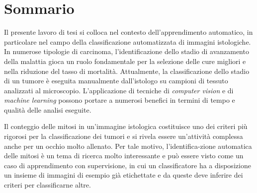\newpage
\chapter*{Sommario}



\vspace{1.3cm}


Il presente lavoro di tesi si colloca nel contesto dell'apprendimento automatico, in particolare 
nel campo della classificazione automatizzata di immagini istologiche.\\
In numerose tipologie di carcinoma, l'identificazione dello stadio di avanzamento della malattia gioca un ruolo fondamentale
per la selezione delle cure migliori e nella riduzione del tasso di mortalit\`{a}. Attualmente, la classificazione
dello stadio di un tumore \`{e} eseguita manualmente dall'istologo su campioni di tessuto analizzati al microscopio.
L'applicazione di tecniche di \textit{computer vision} e di \textit{machine learning} possono portare a numerosi benefici in termini di
tempo e qualit\`{a} delle analisi eseguite.

\vspace{0.3cm}

Il conteggio delle mitosi in un'immagine istologica costituisce uno dei criteri pi\`{u} rigorosi per la classificazione dei tumori e
si rivela essere un'attivit\`{a} complessa anche per un occhio molto allenato. Per tale motivo, l'identifica-zione automatica delle 
mitosi \`{e} un tema di ricerca molto interessante e pu\`{o} essere visto come un caso di apprendimento con supervisione, in cui un classificatore 
ha a disposizione un insieme di immagini di esempio gi\`{a} etichettate e da queste deve inferire dei criteri per classificarne altre.

